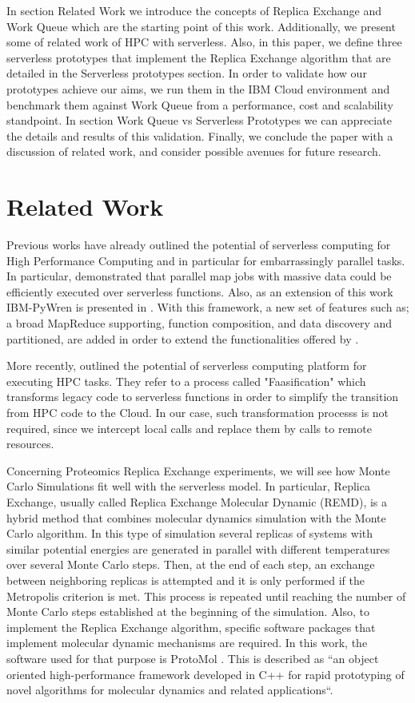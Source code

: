\documentclass[sigplan, screen]{acmart}
\begin{document}
In section Related Work we introduce the concepts of Replica Exchange and Work Queue which are the starting point of this work. Additionally, we present some of related work of HPC with serverless. Also, in this paper, we define three serverless prototypes that implement the Replica Exchange algorithm that are detailed in the Serverless prototypes section. In order to validate how our prototypes achieve our aims, we run them in the IBM Cloud environment and benchmark them against Work Queue from a performance, cost and scalability standpoint. In section Work Queue vs Serverless Prototypes we can appreciate the details and results of this validation. Finally, we conclude the paper with a discussion of related work, and consider possible avenues for future research.

\section{Related Work}
\noindent
Previous works have already outlined the potential of serverless computing for High Performance Computing and in particular for embarrassingly parallel tasks.
In particular, \cite{Jonas2017OccupyTC} demonstrated that parallel map jobs with massive data could be efficiently executed over serverless functions. Also, as an extension of this work IBM-PyWren is presented in \cite{ibmPyWren}. With this framework,  a new set of features such as; a broad MapReduce supporting, function composition,  and  data discovery and partitioned, are added in order to extend the functionalities offered by  \cite{Jonas2017OccupyTC}.

More recently, \cite {spillner2017faaster} outlined the potential of serverless computing platform for executing HPC tasks. They refer to a process called "Faasification"  which transforms legacy code to serverless functions in order to simplify the transition from HPC code to the Cloud. In our case, such transformation processs is not required, since we intercept local calls and replace them by calls to remote resources.

Concerning Proteomics Replica Exchange experiments, we will see how Monte Carlo Simulations fit well with the serverless model. In particular, Replica Exchange, usually called Replica Exchange Molecular Dynamic (REMD), is a hybrid method that combines molecular dynamics simulation with the Monte Carlo algorithm\cite{replicaExchange}. In this type of simulation several replicas of systems with similar potential energies are generated in parallel with different temperatures over several Monte Carlo steps. Then, at the end of each step, an exchange between neighboring replicas is attempted and it is only performed if the Metropolis criterion\cite{metropolis53} is met. This process is repeated until reaching the number of Monte Carlo steps established at the beginning of the simulation. Also, to implement the Replica Exchange algorithm, specific software packages that implement molecular dynamic mechanisms are required. In this work, the software used for that purpose is ProtoMol \cite{protomol}. This is described as “an object oriented high-performance framework developed in C++ for rapid prototyping of novel algorithms for molecular dynamics and related applications“.
\end{document}
